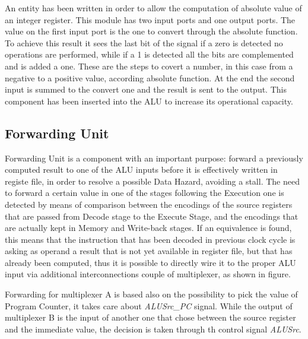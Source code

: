 An entity has been written in order to allow the computation of absolute value of an integer register.
This module has two input ports and one output ports. The value on the first input port is the one to convert 
through the absolute function. To achieve this result it sees the last bit of the signal if a zero is detected 
no operations are performed, while if a 1 is detected all the bits are complemented and is added a one. 
These are the steps to covert a number, in this case from a negative to a positive value, according absolute function.
At the end the second input is summed to the convert one and the result is sent to the output.
This component has been inserted into the ALU to increase its operational capacity.

\subsection{Forwarding Unit}

Forwarding Unit is a component with an important purpose: forward a previously computed result to one of the ALU inputs
before it is effectively written in registe file, in order to resolve a possible Data Hazard, avoiding a stall.
The need to forward a certain value in one of the stages following the Execution one is detected by means of comparison between the encodings of the source registers 
that are passed from Decode stage to the Execute Stage, and the encodings that are actually kept in Memory and Write-back stages.
If an equivalence is found, this means that the instruction that has been decoded in previous clock cycle is asking as operand a result that is not yet available 
in register file, but that has already been computed, thus it is possible to directly wire it to the proper ALU input via additional interconnections
couple of multiplexer, as shown in figure.  

Forwarding for multiplexer A is based also on the possibility to pick the value of Program Counter, it takes care about \textit{ALUSrc\_PC} signal.
While the output of multiplexer B is the input of another one that chose between the source register and the immediate value, the decision is 
taken through th control signal \textit{ALUSrc}. 

